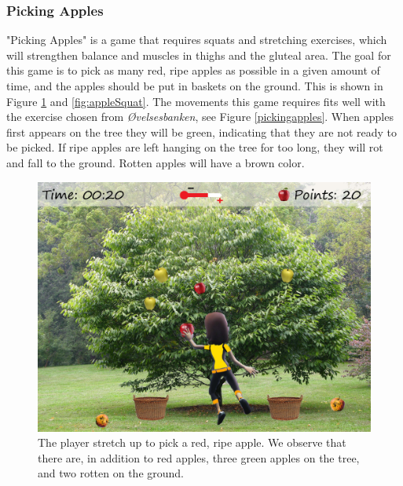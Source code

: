 \subsubsection{Picking Apples}
"Picking Apples" is a game that requires squats and stretching exercises, which will strengthen balance and muscles in thighs and the gluteal area. The goal for this game is to pick as many red, ripe apples as possible in a given amount of time, and the apples should be put in baskets on the ground. This is shown in Figure \ref{fig:appleStretch} and \ref{fig:appleSquat}. The movements this game requires fits well with the exercise chosen from \emph{Øvelsesbanken}, see Figure \ref{pickingapples}. When apples first appears on the tree they will be green, indicating that they are not ready to be picked. If ripe apples are left hanging on the tree for too long, they will rot and fall to the ground. Rotten apples will have a brown color. 

\begin{figure} [H]
\centering
\includegraphics[scale=0.1]{gameappletreeEng.jpg}
\caption[Picking apples - stretching]{The player stretch up to pick a red, ripe apple. We observe that there are, in addition to red apples, three green apples on the tree, and two rotten on the ground.}
\label{fig:appleStretch}
\end{figure}

